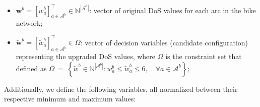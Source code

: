 \documentclass[letterpaper, 10 pt, conference]{ieeeconf}  %
\begin{document}
\begin{itemize}
    \item $\mathbf{w}^{b} = \left [  w_{a}^{b} \right ]_{a \in \mathcal{A}^{b}}^\top \in \mathbb{N}^{|\mathcal{A}^{b}|}$: vector of original DoS values for each arc in the bike network;
    \item $\tilde{\mathbf{w}}^{b} = \left [   \tilde{w}_{a}^{b} \right ]_{a \in \mathcal{A}^{b}}^\top \in \Omega$: vector of decision variables (candidate configuration) representing the upgraded DoS values, where $\Omega$ is the constraint set that defined as $\Omega~=~\left \{ \tilde{w}^{b} \in \mathbb{N}^{|\mathcal{A}^{b}|} \colon w_{a}^{b} \leq \tilde{w}_{a}^{b} \leq 6, \quad \forall a \in\mathcal{A}^{b} \right\};$
\end{itemize}
Additionally, we define the following variables, all normalized between their respective minimum and maximum values:
\end{document}
